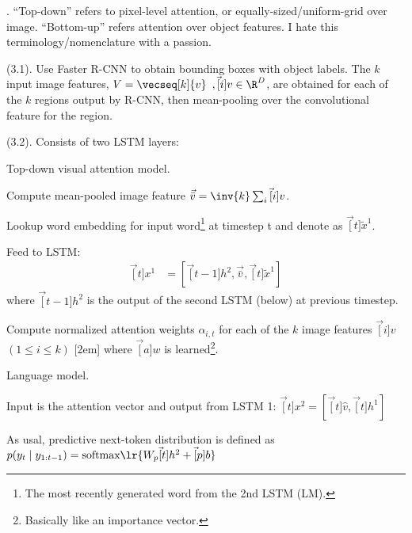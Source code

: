 \documentclass[11pt]{article}
\begin{document}
. ``Top-down'' refers to pixel-level attention, or equally-sized/uniform-grid over image. ``Bottom-up'' refers attention over object features. I hate this terminology/nomenclature with a passion. 

 (3.1). Use Faster R-CNN to obtain bounding boxes with object labels. The $k$ input image features, $V = \vecseq[k]{v}$ $, \vec[i]{v} \in \R^D$, are obtained for each of the $k$ regions output by R-CNN, then mean-pooling over the convolutional feature for the region.  

 (3.2).  Consists of two LSTM layers:
\begin{compactenum}
	\item Top-down visual attention model. 
	\begin{compactenum}
		\item Compute mean-pooled image feature $\vec{\bar v} = \inv{k} \sum_i \vec[i]{v}$. 
		\item Lookup word embedding for input word\footnote{The most recently generated word from the 2nd LSTM (LM).} at timestep t and denote as $\vec[t]{\widetilde x}^1$. 
		\item Feed to LSTM:
		\begin{align}
			\vec[t]{x}^1 &= \left[  \vec[t-1]{h}^2,   \vec{\bar v},   \vec[t]{\widetilde x}^1   \right]
		\end{align}
		where $\vec[t-1]{h}^2$ is the output of the second LSTM (below) at previous timestep.
		\item Compute normalized attention weights $\alpha_{i,t}$ for each of the $k$ image features $\vec[i]{v}$ $(1 \le i \le k)$ 
		where $\vec[a]{w}$ is learned\footnote{Basically like an importance vector.}.
	\end{compactenum}
	
	\item Language model. 
	\begin{compactenum}
		\item Input is the attention vector and output from LSTM 1: $\vec[t]{x}^2 = \left[   \vec[t]{\hat v}, \vec[t]{h}^1 \right]$
		\item As usal, predictive next-token distribution is defined as $p(y_t \mid y_{1:t-1}) = \text{softmax}\lr{  W_p \vec[t]{h}^2 + \vec[p]{b}  }$
	\end{compactenum}
\end{compactenum}
\end{document}
